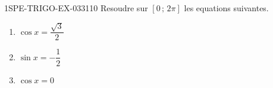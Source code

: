 \begin{exercice}{1SPE-TRIGO-EX-033}{1}{10}
Resoudre sur $[0\,;\,2\pi]$ les equations suivantes.
\begin{enumerate}
  \item $\cos x = \dfrac{\sqrt{3}}{2}$
  \item $\sin x = -\dfrac{1}{2}$
  \item $\cos x = 0$
\end{enumerate}
\end{exercice}
